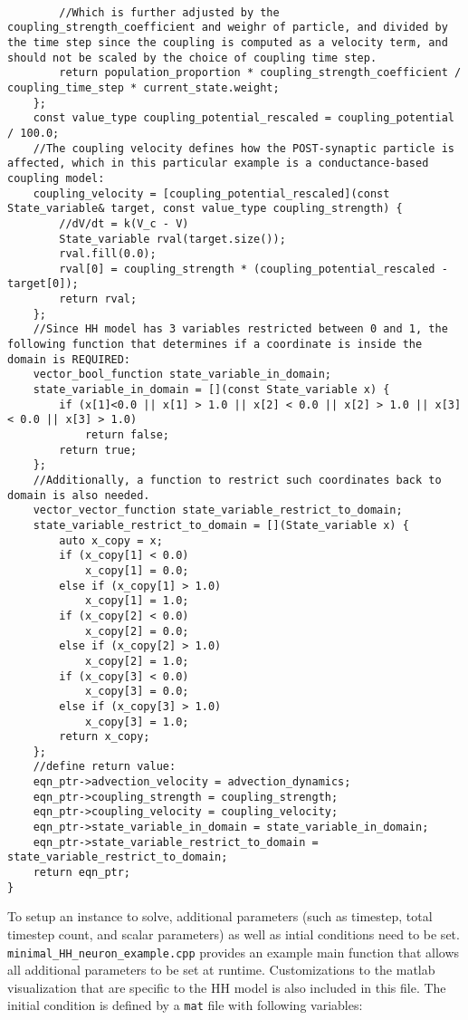 \documentclass[10pt]{article} %
\begin{document}
\begin{lstlisting}
        
        //Which is further adjusted by the coupling_strength_coefficient and weighr of particle, and divided by the time step since the coupling is computed as a velocity term, and should not be scaled by the choice of coupling time step.
        return population_proportion * coupling_strength_coefficient / coupling_time_step * current_state.weight;
    };
    const value_type coupling_potential_rescaled = coupling_potential / 100.0;
    //The coupling velocity defines how the POST-synaptic particle is affected, which in this particular example is a conductance-based coupling model:
    coupling_velocity = [coupling_potential_rescaled](const State_variable& target, const value_type coupling_strength) {
        //dV/dt = k(V_c - V) 
        State_variable rval(target.size());
        rval.fill(0.0);
        rval[0] = coupling_strength * (coupling_potential_rescaled - target[0]);
        return rval;
    };
    //Since HH model has 3 variables restricted between 0 and 1, the following function that determines if a coordinate is inside the domain is REQUIRED:
    vector_bool_function state_variable_in_domain;
    state_variable_in_domain = [](const State_variable x) {
        if (x[1]<0.0 || x[1] > 1.0 || x[2] < 0.0 || x[2] > 1.0 || x[3] < 0.0 || x[3] > 1.0)
            return false;
        return true;
    };
    //Additionally, a function to restrict such coordinates back to domain is also needed.
    vector_vector_function state_variable_restrict_to_domain;
    state_variable_restrict_to_domain = [](State_variable x) {
        auto x_copy = x;
        if (x_copy[1] < 0.0)
            x_copy[1] = 0.0;
        else if (x_copy[1] > 1.0)
            x_copy[1] = 1.0;
        if (x_copy[2] < 0.0)
            x_copy[2] = 0.0;
        else if (x_copy[2] > 1.0)
            x_copy[2] = 1.0;
        if (x_copy[3] < 0.0)
            x_copy[3] = 0.0;
        else if (x_copy[3] > 1.0)
            x_copy[3] = 1.0;
        return x_copy;
    };
    //define return value:
    eqn_ptr->advection_velocity = advection_dynamics;
    eqn_ptr->coupling_strength = coupling_strength;
    eqn_ptr->coupling_velocity = coupling_velocity;
    eqn_ptr->state_variable_in_domain = state_variable_in_domain;
    eqn_ptr->state_variable_restrict_to_domain = state_variable_restrict_to_domain;
    return eqn_ptr;
}
\end{lstlisting}
To setup an instance to solve, additional parameters (such as timestep, total timestep count, and scalar parameters) as well as intial conditions need to be set. \texttt{minimal\_HH\_neuron\_example.cpp} provides an example main function that allows all additional parameters to be set at runtime. Customizations to the matlab visualization that are specific to the HH model is also included in this file. The initial condition is defined by a \texttt{mat} file with following variables:
\end{document}
